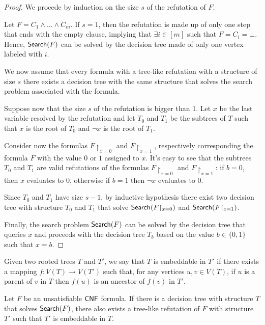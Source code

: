\begin{proof}
    We procede by induction on the size $s$ of the refutation of $F$.

    Let $F = C_1 \land \ldots \land C_m$. If $s = 1$, then the refutation is made up of only one step that ends with the empty clause, implying that $\exists i \in [m]$ such that $F = C_i = \bot$. Hence, $\mathsf{Search}(F)$ can be solved by the decision tree made of only one vertex labeled with $i$.

    We now assume that every formula with a tree-like refutation with a structure of size $s$ there exists a decision tree with the same structure that solves the search problem associated with the formula.

    Suppose now that the size $s$ of the refutation is bigger than 1. Let $x$ be the last variable resolved by the refutation and let $T_0$ and $T_1$ be the subtrees of $T$ such that $x$ is the root of $T_0$ and $\lnot{x}$ is the root of $T_1$.

    Consider now the formulas $F{\upharpoonright_{x=0}}$ and $F{\upharpoonright_{x=1}}$, respectively corresponding the formula $F$ with the value $0$ or $1$ assigned to $x$. It's easy to see that the subtrees $T_0$ and $T_1$ are valid refutations of the formulas $F{\upharpoonright_{x=0}}$ and $F{\upharpoonright_{x=1}}$: if $b = 0$, then $x$ evaluates to $0$, otherwise if $b = 1$ then $\lnot{x}$ evaluates to 0.

    Since $T_0$ and $T_1$ have size $s-1$, by inductive hypothesis there exist two decision tree with structure $T_0$ and $T_1$ that solve $\mathsf{Search}(F{\upharpoonright_{x=0}})$ and $\mathsf{Search}(F{\upharpoonright_{x=1}})$.

    Finally, the search problem $\mathsf{Search}(F)$ can be solved by the decision tree that queries $x$ and proceeds with the decision tree $T_b$ based on the value $b \in \{0,1\}$ such that $x = b$.

\end{proof}

\begin{definition}
Given two rooted trees $T$ and $T'$, we say that $T$ is embeddable in $T'$ if there exists a mapping $f : V(T) \to V(T')$ such that, for any vertices $u,v \in V(T)$, if $u$ is a parent of $v$ in $T$ then $f(u)$ is an ancestor of $f(v)$ in $T'$.
\end{definition}

\begin{lemma} \label{lem:dt_treeres}
    \cite{treelike_res_size,search_problems_dt_model}
    Let $F$ be an unsatisfiable $\mathsf{CNF}$ formula. If there is a decision tree with structure $T$ that solves $\mathsf{Search}(F)$, there also exists a tree-like refutation of $F$ with structure $T'$ such that $T'$ is embeddable in $T$.
\end{lemma}

